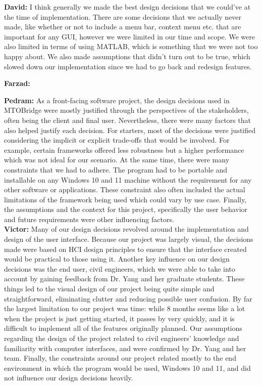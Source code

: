 \documentclass{article}
\begin{document}
\textbf{David:} I think generally we made the best design decisions that we could've at the time of implementation. There are some decisions that we actually never made, like whether or not to include a menu bar, context menu etc. that are important for any GUI, however we were limited in our time and scope. We were also limited in terms of using MATLAB, which is something that we were not too happy about. We also made assumptions that didn't turn out to be true, which slowed down our implementation since we had to go back and redesign features.

\textbf{Farzad:}

\textbf{Pedram:} As a front-facing software project, the design decisions used in MTOBridge were mostly justified through the perspectives of the stakeholders, often being the 
client and final user. Nevertheless, there were many factors that also helped justify each decision. For starters, most of the decisions were justified considering the implicit 
or explicit trade-offs that would be involved. For example, certain frameworks offered less robustness but a higher performance which was not ideal for our scenario. 
At the same time, there were many constraints that we had to adhere. The program had to be portable and installable on any Windows 10 and 11 machine without the requirement 
for any other software or applications. These constraint also often included the actual limitations of the framework being used which could vary by use case. Finally, 
the assumptions and the context for this project, specifically the user behavior and future requirements were other influencing factors.\\

\textbf{Victor:} Many of our design decisions revolved around the implementation and design of the user interface. Because our project was largely visual, the decisions made 
were based on HCI design principles to ensure that the interface created would be practical to those using it. Another key influence on our design decisions was the end user, 
civil engineers, which we were able to take into account by gaining feedback from Dr. Yang and her graduate students. These things led to the visual design of our project being 
quite simple and straightforward, eliminating clutter and reducing possible user confusion. By far the largest limitation to our project was time: while 8 months seems like a 
lot when the project is just getting started, it passes by very quickly, and it is difficult to implement all of the features originally planned. Our assumptions regarding the 
design of the project related to civil engineers' knowledge and familiarity with computer interfaces, and were confirmed by Dr. Yang and her team. Finally, the constraints 
around our project related mostly to the end environment in which the program would be used, Windows 10 and 11, and did not influence our design decisions heavily. 
\end{document}
